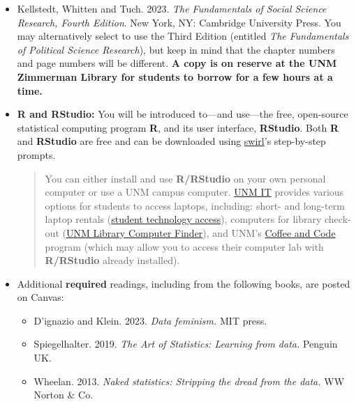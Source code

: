 \documentclass[11pt]{article}
\begin{document}
\begin{itemize}
\item Kellstedt, Whitten and Tuch. 2023. \textit{The Fundamentals of Social Science Research, Fourth Edition}. New York, NY: Cambridge University Press. You may alternatively select to use the Third Edition (entitled \textit{The Fundamentals of Political Science Research}), but keep in mind that the chapter numbers and page numbers will be different. \textbf{A copy is on reserve at the UNM Zimmerman Library for students to borrow for a few hours at a time.}

\item \textbf{\textsf{R} and \textsf{RStudio}: }You will be introduced to---and use---the free, open-source statistical computing program \textbf{\textsf{R}}, and its user interface, \textbf{\textsf{RStudio}}. Both \textbf{\textsf{R}} and \textbf{\textsf{RStudio}} are free and can be downloaded using \href{https://swirlstats.com/students.htm}{swirl}'s step-by-step prompts.

\begin{quotation} \noindent You can either install and use \textbf{\textsf{R/RStudio}} on your own personal computer or use a UNM campus computer. \href{https://it.unm.edu/support/index.html}{UNM IT} provides various options for students to access laptops, including: short- and long-term laptop rentals (\href{https://at.unm.edu/coronavirus/student-tech-access.html}{student technology access}), computers for library check-out (\href{https://library.unm.edu/services/technology/computers/finder.php}{UNM Library Computer Finder}), and
UNM's \href{https://libguides.unm.edu/coffee-and-code/Coffee-and-Code}{Coffee and Code} program (which may allow you to access their computer lab with \textbf{\textsf{R/RStudio}} already installed). \end{quotation}

\item Additional \textbf{required} readings, including from the following books, are posted on Canvas:
\begin{itemize}
    \item D'ignazio and Klein. 2023. \textit{Data feminism.} MIT press.
    \item Spiegelhalter. 2019. \textit{The Art of Statistics: Learning from data.} Penguin UK.
    \item Wheelan. 2013. \textit{Naked statistics: Stripping the dread from the data.} WW Norton \& Co.
\end{itemize}

\end{itemize}
\end{document}
